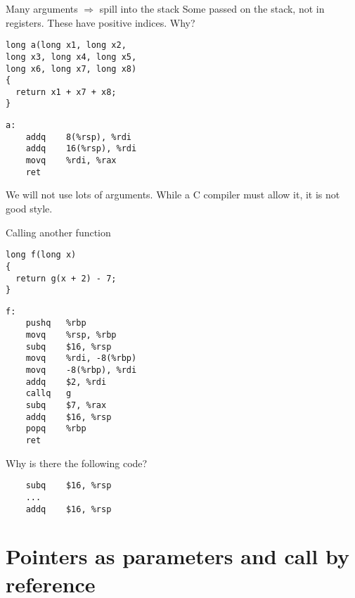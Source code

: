 \documentclass[landscape]{beamer}
\begin{document}
\begin{frame}[fragile]{Many arguments $\Rightarrow$ spill into the stack}
Some passed on the stack, not in registers. These have positive indices. Why?
\\[2em]

\begin{minipage}{.55\textwidth}
\begin{verbatim}
long a(long x1, long x2, 
long x3, long x4, long x5, 
long x6, long x7, long x8)
{
  return x1 + x7 + x8;
}
\end{verbatim}
\end{minipage}
%
\begin{minipage}{.4\textwidth}
\begin{verbatim}
a:                             
	addq	8(%rsp), %rdi
	addq	16(%rsp), %rdi
	movq	%rdi, %rax
	ret
\end{verbatim}
\end{minipage}
\vspace{2em}

We will not use lots of arguments. While a C compiler must allow it, it is not good style.

\end{frame}

\begin{frame}[fragile]{Calling another function}
\begin{minipage}{.5\textwidth}
\begin{verbatim}
long f(long x)
{
  return g(x + 2) - 7;
}
\end{verbatim}
\end{minipage}
%
\begin{minipage}{.4\textwidth}
\begin{verbatim}
f:  
	pushq	%rbp
	movq	%rsp, %rbp
	subq	$16, %rsp
	movq	%rdi, -8(%rbp)
	movq	-8(%rbp), %rdi
	addq	$2, %rdi
	callq	g
	subq	$7, %rax
	addq	$16, %rsp
	popq	%rbp
	ret
\end{verbatim}
\end{minipage}
\vspace{1em}

Why is there the following code?
\begin{verbatim}
	subq	$16, %rsp
	...
	addq	$16, %rsp	
\end{verbatim}


\end{frame}


\section{Pointers as parameters and call by reference}
\end{document}
